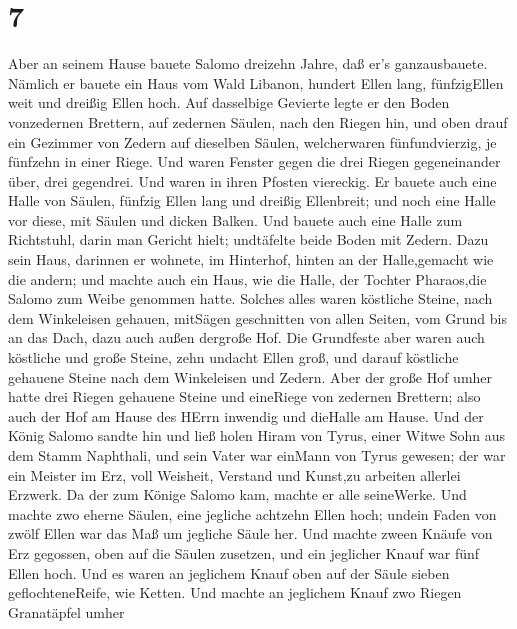 \hypertarget{section-6}{%
\section{7}\label{section-6}}

 Aber an seinem Hause bauete Salomo dreizehn Jahre, daß er's
ganzausbauete.  Nämlich er bauete ein Haus vom Wald Libanon,
hundert Ellen lang, fünfzigEllen weit und dreißig Ellen hoch. Auf
dasselbige Gevierte legte er den Boden vonzedernen Brettern, auf
zedernen Säulen, nach den Riegen hin,  und oben drauf ein
Gezimmer von Zedern auf dieselben Säulen, welcherwaren fünfundvierzig,
je fünfzehn in einer Riege.  Und waren Fenster gegen die
drei Riegen gegeneinander über, drei gegendrei.  Und waren
in ihren Pfosten viereckig.  Er bauete auch eine Halle von
Säulen, fünfzig Ellen lang und dreißig Ellenbreit; und noch eine Halle
vor diese, mit Säulen und dicken Balken.  Und bauete auch
eine Halle zum Richtstuhl, darin man Gericht hielt; undtäfelte beide
Boden mit Zedern.  Dazu sein Haus, darinnen er wohnete, im
Hinterhof, hinten an der Halle,gemacht wie die andern; und machte auch
ein Haus, wie die Halle, der Tochter Pharaos,die Salomo zum Weibe
genommen hatte.  Solches alles waren köstliche Steine, nach
dem Winkeleisen gehauen, mitSägen geschnitten von allen Seiten, vom
Grund bis an das Dach, dazu auch außen dergroße Hof.  Die
Grundfeste aber waren auch köstliche und große Steine, zehn undacht
Ellen groß,  und darauf köstliche gehauene Steine nach dem
Winkeleisen und Zedern.  Aber der große Hof umher hatte
drei Riegen gehauene Steine und eineRiege von zedernen Brettern; also
auch der Hof am Hause des HErrn inwendig und dieHalle am Hause.
 Und der König Salomo sandte hin und ließ holen Hiram von
Tyrus,  einer Witwe Sohn aus dem Stamm Naphthali, und sein
Vater war einMann von Tyrus gewesen; der war ein Meister im Erz, voll
Weisheit, Verstand und Kunst,zu arbeiten allerlei Erzwerk. Da der zum
Könige Salomo kam, machte er alle seineWerke.  Und machte
zwo eherne Säulen, eine jegliche achtzehn Ellen hoch; undein Faden von
zwölf Ellen war das Maß um jegliche Säule her.  Und machte
zween Knäufe von Erz gegossen, oben auf die Säulen zusetzen, und ein
jeglicher Knauf war fünf Ellen hoch.  Und es waren an
jeglichem Knauf oben auf der Säule sieben geflochteneReife, wie Ketten.
 Und machte an jeglichem Knauf zwo Riegen Granatäpfel umher
